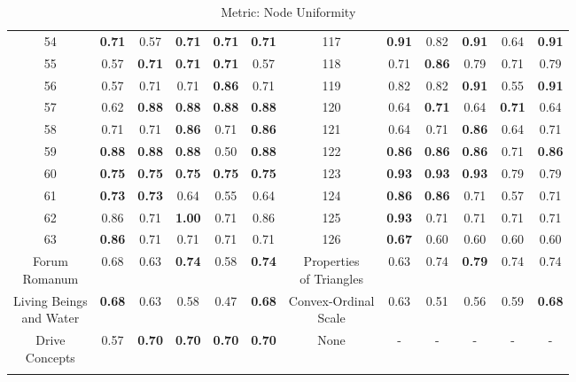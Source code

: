 \documentclass{article}
\begin{document}
{\begin{longtable}{cccccc@{\qquad}cccccc}
54 & \textbf{0.71} & 0.57 & \textbf{0.71} & \textbf{0.71} & \textbf{0.71} & 117 & \textbf{0.91} & 0.82 & \textbf{0.91} & 0.64 & \textbf{0.91} \\
55 & 0.57 & \textbf{0.71} & \textbf{0.71} & \textbf{0.71} & 0.57 & 118 & 0.71 & \textbf{0.86} & 0.79 & 0.71 & 0.79 \\
56 & 0.57 & 0.71 & 0.71 & \textbf{0.86} & 0.71 & 119 & 0.82 & 0.82 & \textbf{0.91} & 0.55 & \textbf{0.91} \\
57 & 0.62 & \textbf{0.88} & \textbf{0.88} & \textbf{0.88} & \textbf{0.88} & 120 & 0.64 & \textbf{0.71} & 0.64 & \textbf{0.71} & 0.64 \\
58 & 0.71 & 0.71 & \textbf{0.86} & 0.71 & \textbf{0.86} & 121 & 0.64 & 0.71 & \textbf{0.86} & 0.64 & 0.71 \\
59 & \textbf{0.88} & \textbf{0.88} & \textbf{0.88} & 0.50 & \textbf{0.88} & 122 & \textbf{0.86} & \textbf{0.86} & \textbf{0.86} & 0.71 & \textbf{0.86} \\
60 & \textbf{0.75} & \textbf{0.75} & \textbf{0.75} & \textbf{0.75} & \textbf{0.75} & 123 & \textbf{0.93} & \textbf{0.93} & \textbf{0.93} & 0.79 & 0.79 \\
61 & \textbf{0.73} & \textbf{0.73} & 0.64 & 0.55 & 0.64 & 124 & \textbf{0.86} & \textbf{0.86} & 0.71 & 0.57 & 0.71 \\
62 & 0.86 & 0.71 & \textbf{1.00} & 0.71 & 0.86 & 125 & \textbf{0.93} & 0.71 & 0.71 & 0.71 & 0.71 \\
63 & \textbf{0.86} & 0.71 & 0.71 & 0.71 & 0.71 & 126 & \textbf{0.67} & 0.60 & 0.60 & 0.60 & 0.60 \\
\makecell[c]{Forum \\ Romanum} & 0.68 & 0.63 & \textbf{0.74} & 0.58 & \textbf{0.74} & \makecell[c]{Properties \\ of Triangles} & 0.63 & 0.74 & \textbf{0.79} & 0.74 & 0.74 \\
\makecell[c]{Living Beings \\ and Water} & \textbf{0.68} & 0.63 & 0.58 & 0.47 & \textbf{0.68} & \makecell[c]{Convex-Ordinal \\ Scale} & 0.63 & 0.51 & 0.56 & 0.59 & \textbf{0.68} \\
\makecell[c]{Drive \\ Concepts} & 0.57 & \textbf{0.70} & \textbf{0.70} & \textbf{0.70} & \textbf{0.70} & None & - & - & - & - & - \\
\caption{Metric: Node Uniformity} \\
\end{longtable}
}
\end{document}
